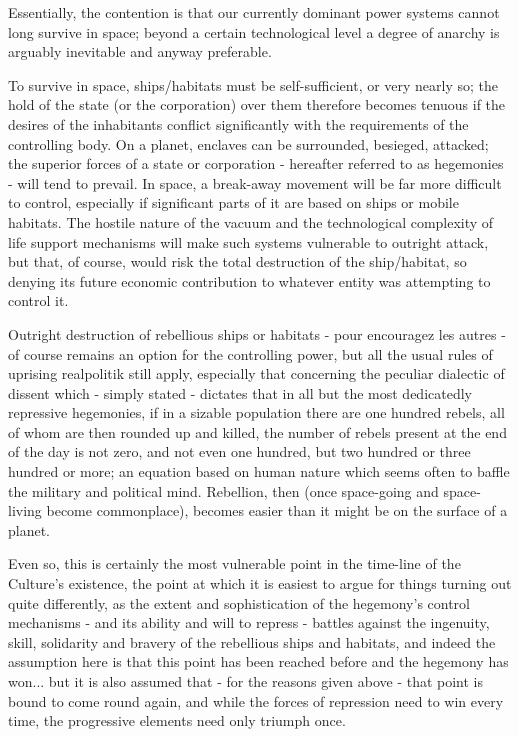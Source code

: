 Essentially, the contention is that our currently dominant power systems cannot long survive in space; beyond a certain technological level a degree of anarchy is arguably inevitable and anyway preferable.

To survive in space, ships/habitats must be self-sufficient, or very nearly so; the hold of the state (or the corporation) over them therefore becomes tenuous if the desires of the inhabitants conflict significantly with the requirements of the controlling body. On a planet, enclaves can be surrounded, besieged, attacked; the superior forces of a state or corporation - hereafter referred to as hegemonies - will tend to prevail. In space, a break-away movement will be far more difficult to control, especially if significant parts of it are based on ships or mobile habitats. The hostile nature of the vacuum and the technological complexity of life support mechanisms will make such systems vulnerable to outright attack, but that, of course, would risk the total destruction of the ship/habitat, so denying its future economic contribution to whatever entity was attempting to control it.

Outright destruction of rebellious ships or habitats - pour encouragez les autres - of course remains an option for the controlling power, but all the usual rules of uprising realpolitik still apply, especially that concerning the peculiar dialectic of dissent which - simply stated - dictates that in all but the most dedicatedly repressive hegemonies, if in a sizable population there are one hundred rebels, all of whom are then rounded up and killed, the number of rebels present at the end of the day is not zero, and not even one hundred, but two hundred or three hundred or more; an equation based on human nature which seems often to baffle the military and political mind. Rebellion, then (once space-going and space-living become commonplace), becomes easier than it might be on the surface of a planet.

Even so, this is certainly the most vulnerable point in the time-line of the Culture's existence, the point at which it is easiest to argue for things turning out quite differently, as the extent and sophistication of the hegemony's control mechanisms - and its ability and will to repress - battles against the ingenuity, skill, solidarity and bravery of the rebellious ships and habitats, and indeed the assumption here is that this point has been reached before and the hegemony has won... but it is also assumed that - for the reasons given above - that point is bound to come round again, and while the forces of repression need to win every time, the progressive elements need only triumph once.

